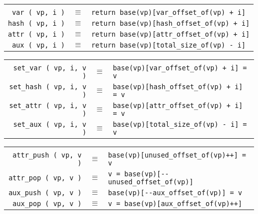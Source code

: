 \documentclass[12pt]{article}
\newenvironment{indpar}[1][0.3in]%
	{\begin{list}{}%
		     {\setlength{\itemsep}{0in}%
		      \setlength{\topsep}{0in}%
		      \setlength{\parsep}{1ex}%
		      \setlength{\labelwidth}{#1}%
		      \setlength{\leftmargin}{#1}%
		      \addtolength{\leftmargin}{\labelsep}}%
	 \item}%
	{\end{list}}
\begin{document}
\begin{indpar}\begin{tabular}{rcl}
\hspace*{2.0in} \\[-3ex]
\verb|var ( vp, i )| & $\equiv$
    & \verb|return base(vp)[var_offset_of(vp) + i]| \\
\verb|hash ( vp, i )| & $\equiv$
    & \verb|return base(vp)[hash_offset_of(vp) + i]| \\
\verb|attr ( vp, i )| & $\equiv$
    & \verb|return base(vp)[attr_offset_of(vp) + i]| \\
\verb|aux ( vp, i )| & $\equiv$
    & \verb|return base(vp)[total_size_of(vp) - i]| \\
\end{tabular}\end{indpar}\label{OBJECT-VECTOR-EQUIVALENTS}
\begin{indpar}\begin{tabular}{rcl}
\hspace*{2.0in} \\[-3ex]
\verb|set_var ( vp, i, v )| & $\equiv$
    & \verb|base(vp)[var_offset_of(vp) + i] = v| \\
\verb|set_hash ( vp, i, v )| & $\equiv$
    & \verb|base(vp)[hash_offset_of(vp) + i] = v| \\
\verb|set_attr ( vp, i, v )| & $\equiv$
    & \verb|base(vp)[attr_offset_of(vp) + i] = v| \\
\verb|set_aux ( vp, i, v )| & $\equiv$
    & \verb|base(vp)[total_size_of(vp) - i] = v| \\
\end{tabular}\end{indpar}
\begin{indpar}\begin{tabular}{rcl}
\hspace*{2.0in} \\[-3ex]
\verb|attr_push ( vp, v )| & $\equiv$
    & \verb|base(vp)[unused_offset_of(vp)++] = v| \\
\verb|attr_pop ( vp, v )| & $\equiv$
    & \verb|v = base(vp)[--unused_offset_of(vp)]| \\
\verb|aux_push ( vp, v )| & $\equiv$
    & \verb|base(vp)[--aux_offset_of(vp)] = v| \\
\verb|aux_pop ( vp, v )| & $\equiv$
    & \verb|v = base(vp)[aux_offset_of(vp)++]| \\
\end{tabular}\end{indpar}
\end{document}
